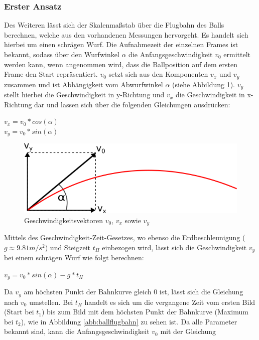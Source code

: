 \documentclass{ezb}
\begin{document}
\subsubsection*{Erster Ansatz}
Des Weiteren lässt sich der Skalenmaßstab über die Flugbahn des Balls berechnen, welche aus den vorhandenen Messungen hervorgeht. Es handelt sich hierbei um einen schrägen Wurf.
Die Aufnahmezeit der einzelnen Frames ist bekannt, sodass über den Wurfwinkel $\alpha$ die Anfangsgeschwindigkeit $v_0$ ermittelt werden kann, wenn angenommen wird, dass die Ballposition auf dem ersten Frame den Start repräsentiert. $v_0$ setzt sich aus den Komponenten $v_x$ und $v_y$ zusammen und ist Abhängigkeit vom Abwurfwinkel $\alpha$ (siehe Abbildung \ref{abb:geschwindigkeiten}). $v_y$ stellt hierbei die Geschwindigkeit in y-Richtung und $v_x$ die Geschwindigkeit in x-Richtung dar und lassen sich über die folgenden Gleichungen ausdrücken:
\begin{center}
$v_x = v_0 * cos(\alpha)$ \\
$v_y = v_0 * sin(\alpha)$
\end{center}
\begin{figure}[!h]
	\centering
	\includegraphics[scale=0.8]{./img/geschwindigkeitsrichtung.png}
	\caption{Geschwindigkeitsvektoren $v_0$, $v_x$ sowie $v_y$}
	\label{abb:geschwindigkeiten}
\end{figure}
Mittels des Geschwindigkeit-Zeit-Gesetzes, wo ebenso die Erdbeschleunigung ($g \approx 9.81m/s^2$) und Steigzeit $t_H$ einbezogen wird, lässt sich die Geschwindigkeit $v_y$ bei einem schrägen Wurf wie folgt berechnen:
\begin{center}
$v_y = v_0 * sin(\alpha) - g * t_H$
\end{center}
Da $v_y$ am höchsten Punkt der Bahnkurve gleich 0 ist, lässt sich die Gleichung nach $v_0$ umstellen. Bei $t_H$ handelt es sich um die vergangene Zeit vom ersten Bild (Start bei $t_1$) bis zum Bild mit dem höchsten Punkt der Bahnkurve (Maximum bei $t_2$), wie in Abbildung \ref{abb:ballflugbahn} zu sehen ist. Da alle Parameter bekannt sind, kann die Anfangsgeschwindigkeit $v_0$  mit der Gleichung 
\end{document}
